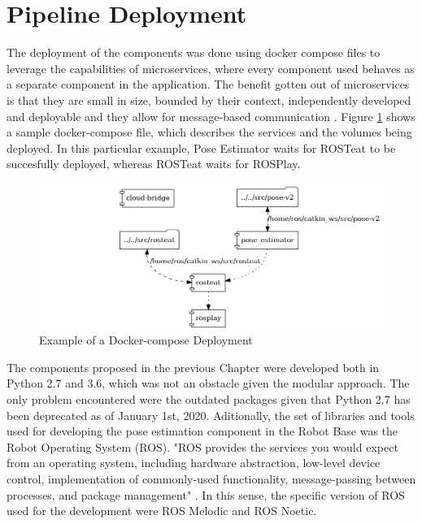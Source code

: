 \newpage
\section{Pipeline Deployment}\label{chap:4:deployment}
The deployment of the components was done using docker compose files to leverage the capabilities of microservices, where every component used behaves as a separate component in the application. The benefit gotten out of microservices is that they are small in size, bounded by their context, independently developed and deployable and they allow for message-based communication%
. 
Figure \ref{fig:cow_docker_topology} shows a sample docker-compose file, which describes the services and the volumes being deployed. In this particular example, Pose Estimator waits for ROSTeat to be succesfully deployed, whereas ROSTeat waits for ROSPlay.

\begin{figure}[h]
    \centering
    \includegraphics[width=1\textwidth]{images/cow_docker_topology.png}
    \caption{Example of a Docker-compose Deployment}
    \label{fig:cow_docker_topology}
\end{figure}

The components proposed in the previous Chapter were developed both in Python 2.7 and 3.6, which was not an obstacle given the modular approach. The only problem encountered were the outdated packages given that Python 2.7 has been deprecated as of January 1st, 2020. 
Aditionally, the set of libraries and tools used for developing the pose estimation component in the Robot Base was the Robot Operating System (ROS). "ROS provides the services you would expect from an operating system, including hardware abstraction, low-level device control, implementation of commonly-used functionality, message-passing between processes, and package management" \cite{2020ROS}. In this sense, the specific version of ROS used for the development were ROS Melodic and ROS Noetic.


